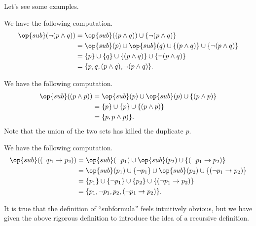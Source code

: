 \documentclass[../notes.tex]{subfiles}
\begin{document}
Let's see some examples.
\begin{example}
	We have the following computation.
	\begin{align*}
		\op{sub}(\lnot(p\land q)) &= \op{sub}((p\land q)) \cup \{\lnot(p\land q)\} \\
		&= \op{sub}(p)\cup\op{sub}(q)\cup\{(p\land q)\} \cup \{\lnot(p\land q)\} \\
		&= \{p\}\cup\{q\}\cup\{(p\land q)\} \cup \{\lnot(p\land q)\} \\
		&= \{p,q,(p\land q),\lnot(p\land q)\}.
	\end{align*}
\end{example}
\begin{example}
	We have the following computation.
	\begin{align*}
		\op{sub}((p\land p)) &= \op{sub}(p)\cup\op{sub}(p)\cup\{(p\land p)\} \\
		&= \{p\}\cup\{p\}\cup\{(p\land p)\} \\
		&= \{p,p\land p)\}.
	\end{align*}
	Note that the union of the two sets has killed the duplicate $p$.
\end{example}
\begin{example}
	We have the following computation.
	\begin{align*}
		\op{sub}((\lnot p_1\to p_2)) &= \op{sub}(\lnot p_1)\cup\op{sub}(p_2)\cup\{(\lnot p_1\to p_2)\} \\
		&= \op{sub}(p_1)\cup\{\lnot p_1\}\cup\op{sub}(p_2)\cup\{(\lnot p_1\to p_2)\} \\
		&= \{p_1\}\cup\{\lnot p_1\}\cup\{p_2\}\cup\{(\lnot p_1\to p_2)\} \\
		&= \{p_1,\lnot p_1,p_2,(\lnot p_1\to p_2)\}.
	\end{align*}
\end{example}
It is true that the definition of ``subformula'' feels intuitively obvious, but we have given the above rigorous definition to introduce the idea of a recursive definition.
\end{document}
